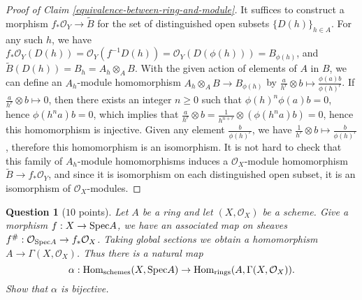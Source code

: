 \documentclass[12pt]{amsart}
\newtheorem{question}{Question}
\begin{document}
\begin{proof}
	[Proof of Claim \ref{equivalence-between-ring-and-module}] It suffices to construct a morphism $f_{\ast }\mathcal{O}_Y \to\tilde{B} $ for the set of distinguished open subsets $\{D(h)\}_{h\in A} $. For any such $h$, we have $f_{\ast}\mathcal{O}_Y (D(h))=\mathcal{O}_Y (f^{-1} D(h))=\mathcal{O}_Y (D(\phi (h)))=B_{\phi (h)} $, and $\tilde{B} (D(h))=B_h =A_h\otimes_A B$. With the given action of elements of $A$ in $B$, we can define an $A_h $-module homomorphism $A_h\otimes_A B\to B_{\phi (h)} $ by $\frac{a}{h^r }\otimes b\mapsto \frac{\phi (a)b}{\phi (h)^r } $. If $\frac{a}{h^r }\otimes b\mapsto 0$, then there exists an integer $n\geq 0$ such that $\phi (h)^n\phi (a)b=0$, hence $\phi (h^n a)b=0$, which implies that $\frac{a}{h^r }\otimes b=\frac{1}{h^{n+r} }\otimes (\phi (h^n a)b)=0$, hence this homomorphism is injective. Given any element $\frac{b}{\phi (h)^r } $, we have $\frac{1}{h^r }\otimes b\mapsto\frac{b}{\phi (h)^r } $, therefore this homomorphism is an isomorphism. It is not hard to check that this family of $A_h $-module homomorphisms induces a $\mathcal{O}_X $-module homomorphism $\tilde{B}\to f_{\ast }\mathcal{O}_Y $,  and since it is isomorphism on each distinguished open subset, it is an isomorphism of $\mathcal{O}_X $-modules.
\end{proof}

\begin{question}[$10$ points]
Let $A$ be a ring and let $(X, \mathcal O_X)$ be a scheme. Give a morphism $f: X \to {\rm Spec} A$, we have an associated map on sheaves $f^\#: \mathcal{O}_{{\rm Spec} A} \to f_*\mathcal O_X$. Taking global sections we obtain a homomorphism $A \to \Gamma(X, \mathcal O_X)$. Thus there is a natural map
\[
\alpha: {\rm Hom}_{\rm schemes}(X, {\rm Spec} A) \to {\rm Hom}_{\rm rings}(A, \Gamma(X, \mathcal O_X)).
\] Show that $\alpha$ is bijective.

\end{question}
\end{document}
